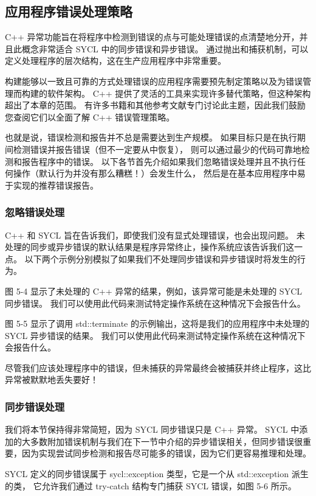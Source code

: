 \subsection{应用程序错误处理策略}
C++ 异常功能旨在将程序中检测到错误的点与可能处理错误的点清楚地分开，并且此概念非常适合 SYCL 中的同步错误和异步错误。 
通过抛出和捕获机制，可以定义处理程序的层次结构，这在生产应用程序中非常重要。

构建能够以一致且可靠的方式处理错误的应用程序需要预先制定策略以及为错误管理而构建的软件架构。 
C++ 提供了灵活的工具来实现许多替代策略，但这种架构超出了本章的范围。 
有许多书籍和其他参考文献专门讨论此主题，因此我们鼓励您查阅它们以全面了解 C++ 错误管理策略。

也就是说，错误检测和报告并不总是需要达到生产规模。 如果目标只是在执行期间检测错误并报告错误（但不一定要从中恢复），
则可以通过最少的代码可靠地检测和报告程序中的错误。 
以下各节首先介绍如果我们忽略错误处理并且不执行任何操作（默认行为并没有那么糟糕！）会发生什么，
然后是在基本应用程序中易于实现的推荐错误报告。

\subsubsection{忽略错误处理}
C++ 和 SYCL 旨在告诉我们，即使我们没有显式处理错误，也会出现问题。 
未处理的同步或异步错误的默认结果是程序异常终止，操作系统应该告诉我们这一点。 
以下两个示例分别模拟了如果我们不处理同步错误和异步错误时将发生的行为。

图 5-4 显示了未处理的 C++ 异常的结果，例如，该异常可能是未处理的 SYCL 同步错误。 
我们可以使用此代码来测试特定操作系统在这种情况下会报告什么。

图 5-5 显示了调用 std::terminate 的示例输出，这将是我们的应用程序中未处理的 SYCL 异步错误的结果。 
我们可以使用此代码来测试特定操作系统在这种情况下会报告什么。

尽管我们应该处理程序中的错误，但未捕获的异常最终会被捕获并终止程序，这比异常被默默地丢失要好！

\subsubsection{同步错误处理}
我们将本节保持得非常简短，因为 SYCL 同步错误只是 C++ 异常。 
SYCL 中添加的大多数附加错误机制与我们在下一节中介绍的异步错误相关，但同步错误很重要，因为实现尝试同步检测和报告尽可能多的错误，因为它们更容易推理和处理。

SYCL 定义的同步错误属于 sycl::exception 类型，它是一个从 std::exception 派生的类，
它允许我们通过 try-catch 结构专门捕获 SYCL 错误，如图 5-6 所示。

